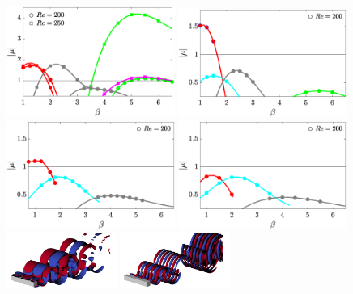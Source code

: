 \begin{figure}
  \centering
  \includegraphics[width=0.49\textwidth]{./fig/AR1s/multipliers_AR1.eps}
  \includegraphics[width=0.49\textwidth]{./fig/AR1s/multipliers_AR1p25.eps}
  \includegraphics[width=0.49\textwidth]{./fig/AR1s/multipliers_AR1p5.eps}
  \includegraphics[width=0.49\textwidth]{./fig/AR1s/multipliers_AR1p75.eps} \\
  \includegraphics[width=0.32\textwidth]{./fig/AR1s/Floqetmode_beta_1p2_Re200_AR1_A.png}
  \includegraphics[width=0.32\textwidth]{./fig/AR1s/Floqetmode_beta_3p75_Re200_AR1_C.png}      

\end{figure}

